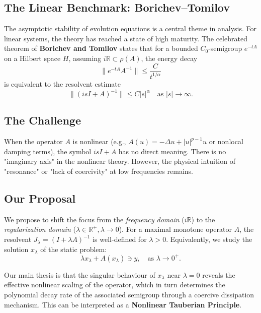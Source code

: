 \documentclass[11pt,reqno]{amsart}
\theoremstyle{remark}
\begin{document}
\subsection{The Linear Benchmark: Borichev--Tomilov}
The asymptotic stability of evolution equations is a central theme in analysis. For linear systems, the theory has reached a state of high maturity. The celebrated theorem of \textbf{Borichev and Tomilov} \cite{BT2010} states that for a bounded $C_0$-semigroup $e^{-tA}$ on a Hilbert space $H$, assuming $i\mathbb{R} \subset \rho(A)$, the energy decay
\[
\|e^{-tA}A^{-1}\| \le \frac{C}{t^{1/\alpha}}
\]
is equivalent to the resolvent estimate
\begin{equation}\label{eq:BT_condition}
\|(isI + A)^{-1}\| \le C |s|^\alpha \quad \text{as } |s| \to \infty.
\end{equation}

\subsection{The Challenge}
When the operator $A$ is nonlinear (e.g., $A(u) = -\Delta u + |u|^{p-1}u$ or nonlocal damping terms), the symbol $isI + A$ has no direct meaning. There is no "imaginary axis" in the nonlinear theory. However, the physical intuition of "resonance" or "lack of coercivity" at low frequencies remains.

\subsection{Our Proposal}
We propose to shift the focus from the \textit{frequency domain} ($i\mathbb{R}$) to the \textit{regularization domain} ($\lambda \in \mathbb{R}^+, \lambda \to 0$).
For a maximal monotone operator $A$, the resolvent $J_\lambda = (I + \lambda A)^{-1}$ is well-defined for $\lambda > 0$. Equivalently, we study the solution $x_\lambda$ of the static problem:
\begin{equation} \label{eq:resolvent_real}
    \lambda x_\lambda + A(x_\lambda) \ni y, \quad \text{as } \lambda \to 0^+.
\end{equation}

Our main thesis is that the singular behaviour of $x_\lambda$ near $\lambda = 0$
reveals the effective nonlinear scaling of the operator, which in turn determines
the polynomial decay rate of the associated semigroup through a coercive
dissipation mechanism. This can be interpreted as a \textbf{Nonlinear Tauberian Principle}.
\end{document}
